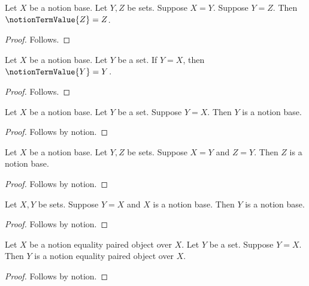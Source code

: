 \begin{proposition}\label{notion_equality_chain}
    Let $X$ be a notion base.
    Let $Y,Z$ be sets.
    Suppose $X=Y$.
    Suppose $Y=Z$.
    Then $\notionTermValue{Z}=Z$.
\end{proposition}
\begin{proof}
    Follows.
\end{proof}

\begin{proposition}\label{notion_equality_guard}
    Let $X$ be a notion base.
    Let $Y$ be a set.
    If $Y=X$, then $\notionTermValue{Y}=Y$.
\end{proposition}
\begin{proof}
    Follows.
\end{proof}

\begin{proposition}\label{notion_equality_by_notion}
    Let $X$ be a notion base.
    Let $Y$ be a set.
    Suppose $Y=X$.
    Then $Y$ is a notion base.
\end{proposition}
\begin{proof}
    Follows by notion.
\end{proof}

\begin{proposition}\label{notion_equality_chain_by_notion}
    Let $X$ be a notion base.
    Let $Y,Z$ be sets.
    Suppose $X=Y$ and $Z=Y$.
    Then $Z$ is a notion base.
\end{proposition}
\begin{proof}
    Follows by notion.
\end{proof}

\begin{proposition}\label{notion_equality_shared_local}
    Let $X,Y$ be sets.
    Suppose $Y=X$ and $X$ is a notion base.
    Then $Y$ is a notion base.
\end{proposition}
\begin{proof}
    Follows by notion.
\end{proof}

\begin{proposition}\label{notion_equality_positional_focus}
    Let $X$ be a notion equality paired object over $X$.
    Let $Y$ be a set.
    Suppose $Y=X$.
    Then $Y$ is a notion equality paired object over $X$.
\end{proposition}
\begin{proof}
    Follows by notion.
\end{proof}

